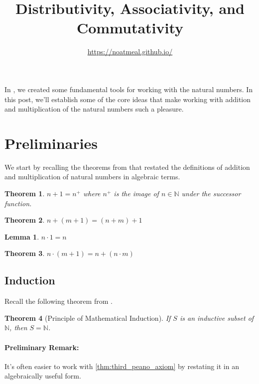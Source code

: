 \documentclass{article}
\title{Distributivity, Associativity, and Commutativity}
\author{\url{https://noatmeal.github.io/}}
\date{}
\theoremstyle{definition}
\theoremstyle{definition}
\theoremstyle{plain}
\theoremstyle{remark}
\theoremstyle{plain}
\newtheorem{theorem}{Theorem}[section]
\theoremstyle{remark}
\theoremstyle{plain}
\newtheorem{lemma}{Lemma}[section]
\theoremstyle{plain}
\theoremstyle{plain}
\theoremstyle{plain}
\begin{document}
\maketitle

In \cite{recursion_theorem}, we created some fundamental tools for working with 
the natural numbers. In this post, we'll establish some of the core ideas that 
make working with addition and multiplication of the natural numbers such a 
pleasure.

\section{Preliminaries}

We start by recalling the theorems from \cite{recursion_theorem} that restated 
the definitions of addition and multiplication of natural numbers in algebraic 
terms.   

\begin{theorem}
  \( n + 1 = n^{+} \) where \( n^{+} \) is the image of \( n \in \mathbb{N} \)
  under the successor function.
  \label{thm:n_plus_one}
\end{theorem}

\begin{theorem}
  \( n + (m + 1) = (n + m) + 1 \)
  \label{thm:associativity_base_case}
\end{theorem}

\begin{lemma}
  \( n \cdot 1 = n \)
  \label{lemma:n_times_one}
\end{lemma}

\begin{theorem}
  \( n \cdot (m + 1) = n + (n \cdot m) \)
  \label{thm:distributivity_base_case}
\end{theorem}


\subsection{Induction}

Recall the following theorem from \cite{recursion_theorem}. 

\begin{theorem}[Principle of Mathematical Induction]
  If \( S \) is an inductive subset of \( \mathbb{N} \), then 
  \( S = \mathbb{N} \).
  \label{thm:third_peano_axiom}
\end{theorem}

\paragraph{Preliminary Remark:} 
It's often easier to work with \autoref{thm:third_peano_axiom} 
by restating it in an algebraically useful form. 
\end{document}
